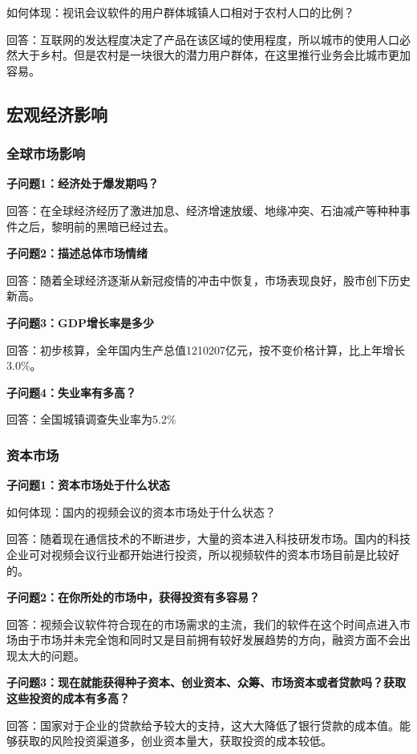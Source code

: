 \documentclass[a4paper,12pt]{article}
\begin{document}
    如何体现：视讯会议软件的⽤户群体城镇⼈⼝相对于农村⼈⼝的⽐例？

    回答：互联⽹的发达程度决定了产品在该区域的使⽤程度，所以城市的使⽤⼈⼝必然⼤于乡村。但是农村是⼀块很⼤的潜⼒⽤户群体，在这⾥推⾏业务会⽐城市更加容易。

    \subsection{宏观经济影响}
    \subsubsection{全球市场影响}
    \textbf{子问题1：经济处于爆发期吗？}

    回答：在全球经济经历了激进加息、经济增速放缓、地缘冲突、石油减产等种种事件之后，黎明前的黑暗已经过去。
    
    \textbf{子问题2：描述总体市场情绪}

    回答：随着全球经济逐渐从新冠疫情的冲击中恢复，市场表现良好，股市创下历史新高。

    \textbf{子问题3：GDP增长率是多少}

    回答：初步核算，全年国内生产总值1210207亿元，按不变价格计算，比上年增长3.0\%。

    \textbf{子问题4：失业率有多高？}

    回答：全国城镇调查失业率为5.2\%

    \subsubsection{资本市场}
    \textbf{子问题1：资本市场处于什么状态}

    如何体现：国内的视频会议的资本市场处于什么状态？

    回答：随着现在通信技术的不断进步，⼤量的资本进⼊科技研发市场。国内的科技企业可对视频会议⾏业都开始进⾏投资，所以视频软件的资本市场⽬前是⽐较好的。
    
    \textbf{子问题2：在你所处的市场中，获得投资有多容易？}

    回答：视频会议软件符合现在的市场需求的主流，我们的软件在这个时间点进⼊市场由于市场并未完全饱和同时⼜是⽬前拥有较好发展趋势的⽅向，融资⽅⾯不会出现太⼤的问题。

    \textbf{子问题3：现在就能获得种子资本、创业资本、众筹、市场资本或者贷款吗？获取这些投资的成本有多高？}

    回答：国家对于企业的贷款给予较⼤的⽀持，这⼤⼤降低了银⾏贷款的成本值。能够获取的⻛险投资渠道多，创业资本量⼤，获取投资的成本较低。
\end{document}
